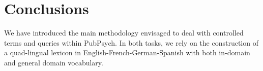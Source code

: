 \documentclass[a4paper,11pt]{article}
\begin{document}
\section{Conclusions}
\label{s:conclusions}

We have introduced the main methodology envisaged to deal with controlled terms and queries within PubPsych. In both tasks, we rely on the construction of a quad-lingual lexicon in English-French-German-Spanish with both in-domain and general domain vocabulary.


%
%
% 
% 
\end{document}

